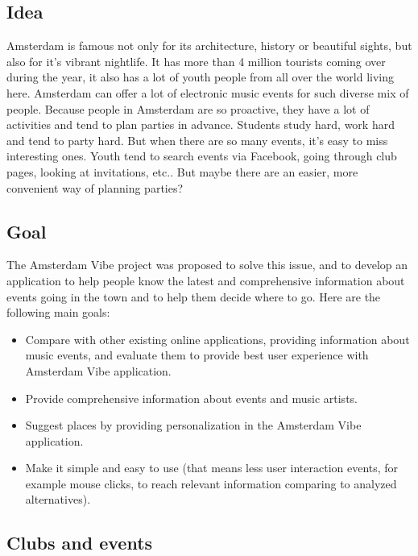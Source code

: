 \documentclass[12pt, a4paper, lithuanian]{article}
\begin{document}
\subsection{Idea}

  Amsterdam is famous not only for its architecture, history or beautiful sights, but also for it's vibrant nightlife. It has more than 4 million tourists coming over during the year, it also has a lot of youth people from all over the world living here. Amsterdam can offer a lot of electronic music events for such diverse mix of people. 
  Because people in Amsterdam are so proactive, they have a lot of activities and tend to plan parties in advance. Students study hard, work hard and tend to party hard. But when there are so many events, it's easy to miss interesting ones. Youth tend to search events via Facebook, going through club pages, looking at invitations, etc.. But maybe there are an easier, more convenient way of planning parties? 

\subsection{Goal}

  The Amsterdam Vibe project was proposed to solve this issue, and to develop an application to help people know the latest and comprehensive information about events going in the town and to help them decide where to go.
  Here are the following main goals:

\begin{itemize}

  \item Compare with other existing online applications, providing information about music events, and evaluate them to provide best user experience with Amsterdam Vibe application.

  \item Provide comprehensive information about events and music artists.

  \item Suggest places by providing personalization in the Amsterdam Vibe application.

  \item Make it simple and easy to use (that means less user interaction events, for example mouse clicks, to reach relevant information comparing to analyzed alternatives).

\end{itemize}

\subsection{Clubs and events}
\end{document}
